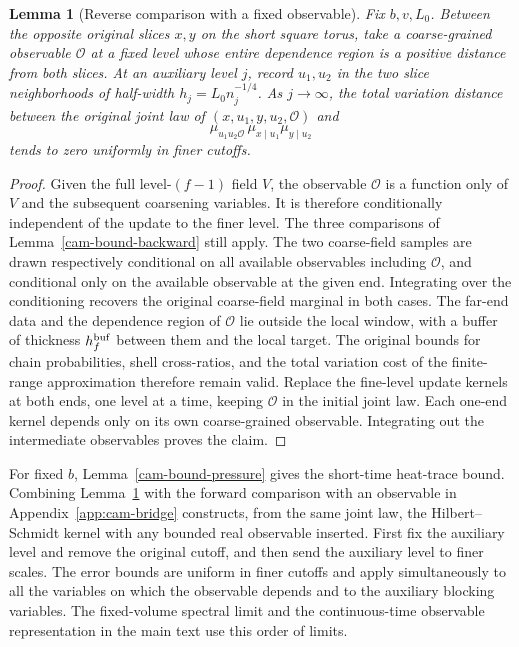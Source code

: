 \documentclass[11pt,a4paper]{article}
\newtheorem{lemma}[theorem]{Lemma}
\numberwithin{equation}{section}
\begin{document}
\begin{lemma}[Reverse comparison with a fixed observable]\label{cam-bound-marked}
Fix \(b,v,L_0\). Between the opposite original slices \(x,y\) on the short square torus, take a coarse-grained observable \(\mathcal O\) at a fixed level whose entire dependence region is a positive distance from both slices. At an auxiliary level \(j\), record \(u_1,u_2\) in the two slice neighborhoods of half-width \(h_j=L_0n_j^{-1/4}\). As \(j\to\infty\), the total variation distance between the original joint law of \((x,u_1,y,u_2,\mathcal O)\) and
\[
 \mu_{u_1u_2\mathcal O}\,\mu_{x\mid u_1}\mu_{y\mid u_2}
\]
tends to zero uniformly in finer cutoffs.
\end{lemma}
\begin{proof}
Given the full level-\((f-1)\) field \(V\), the observable \(\mathcal O\) is a function only of \(V\) and the subsequent coarsening variables. It is therefore conditionally independent of the update to the finer level. The three comparisons of Lemma~\ref{cam-bound-backward} still apply. The two coarse-field samples are drawn respectively conditional on all available observables including \(\mathcal O\), and conditional only on the available observable at the given end. Integrating over the conditioning recovers the original coarse-field marginal in both cases. The far-end data and the dependence region of \(\mathcal O\) lie outside the local window, with a buffer of thickness \(h_f^{\rm buf}\) between them and the local target. The original bounds for chain probabilities, shell cross-ratios, and the total variation cost of the finite-range approximation therefore remain valid. Replace the fine-level update kernels at both ends, one level at a time, keeping \(\mathcal O\) in the initial joint law. Each one-end kernel depends only on its own coarse-grained observable. Integrating out the intermediate observables proves the claim.
\end{proof}

For fixed \(b\), Lemma~\ref{cam-bound-pressure} gives the short-time heat-trace bound. Combining Lemma~\ref{cam-bound-marked} with the forward comparison with an observable in Appendix~\ref{app:cam-bridge} constructs, from the same joint law, the Hilbert--Schmidt kernel with any bounded real observable inserted. First fix the auxiliary level and remove the original cutoff, and then send the auxiliary level to finer scales. The error bounds are uniform in finer cutoffs and apply simultaneously to all the variables on which the observable depends and to the auxiliary blocking variables. The fixed-volume spectral limit and the continuous-time observable representation in the main text use this order of limits.
\end{document}
